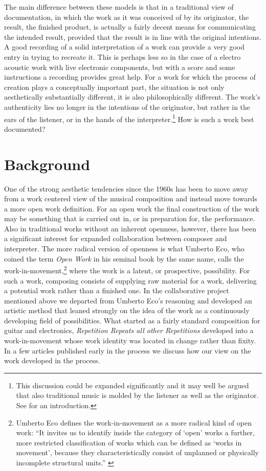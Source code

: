 \documentclass[runningheads,a4paper]{llncs}
\begin{document}
The main difference between these models is that in a traditional view of documentation, in which the work as it was conceived of by its originator, the result, the finished product, is actually a fairly decent means for communicating the intended result, provided that the result is in line with the original intentions. A good recording of a solid interpretation of a work can provide a very good entry in trying to recreate it. This is perhaps less so in the case of a electro acoustic work with live electronic components, but with a score and some instructions a recording provides great help. For a work for which the process of creation plays a conceptually important part, the situation is not only aesthetically substantially different, it is also philosophically different. The work's authenticity lies no longer in the intentions of the originator, but rather in the ears of the listener, or in the hands of the interpreter.\footnote{This discussion could be expanded significantly and it may well be argued that also traditional music is molded by the listener as well as the originator. See \cite{frisk-ost06-2} for an introduction.} How is such a work best documented?

\section{Background}
\label{sec:background}

One of the strong aesthetic tendencies since the 1960s has been to move away from a work centered view of the musical composition and instead move towards a more open work definition. For an open work the final construction of the work may be something that is carried out in, or in preparation for, the performance. Also in traditional works without an inherent openness, however, there has been a significant interest for expanded collaboration between composer and interpreter. The more radical version of openness is what Umberto Eco, who coined the term \emph{Open Work} \cite{eco68} in his seminal book by the same name, calls the work-in-movement,\footnote{Umberto Eco defines the work-in-movement as a more radical kind of open work: ``It invites us to identify inside the category of `open' works a further, more restricted classification of works which can be defined as `works in movement', because they characteristically consist of unplanned or physically incomplete structural units.'' \cite{eco68}} where the work is a latent, or prospective, possibility. For such a work, composing consists of supplying raw material for a work, delivering a potential work rather than a finished one. In the collaborative project mentioned above we departed from Umberto Eco's reasoning and developed an artistic method that leaned strongly on the idea of the work as a continuously developing field of possibilities. What started as a fairly standard composition for guitar and electronics, \emph{Repetition Repeats all other Repetitions} developed into a work-in-movement whose work identity was located in change rather than fixity. \cite{eco68,frisk08} In a few articles published early in the process we discuss how our view on the work developed in the process. \cite{frisk-ost06,frisk-ost06-2}
\end{document}

